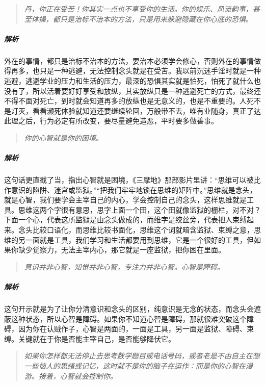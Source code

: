 \begin{quote}\it
    丹，你正在受苦！你其实一点也不享受你的生活。你的娱乐、风流韵事，甚至体操，都只是治标不治本的方法，只是用来躲避隐藏在你心底的恐惧。
\end{quote}

\subparagraph{解析} 外在的事情，都只是治标不治本的方法，要治本必须学会修心，否则外在的事情做得再多，也只是一种逃避，无法控制念头就是在受苦。我以前沉迷手淫时就是一种逃避，逃避学业的压力和生活的压力，最深的恐惧其实就是怕死，怕死了就什么也没有了，所以活着要好好享受和放纵，其实放纵只是一种逃避死亡的方式，最终还不得不面对死亡，到时就会知道再多的放纵也是无意义的，也是不重要的。人死不是灯灭，看看濒死体验就知道还要继续轮回，万般带不去，唯有业随身，真正了达此理之后，行为必定有所改变，要尽量避免造恶，平时要多做善事。

\begin{quote}\it
    你的心智就是你的困境。
\end{quote}

\subparagraph{解析} 这句话更直截了当，指出心智就是困境，《三摩地》那部影片里讲：“思维可以被比作意识的陷阱、迷宫或监狱。”“把我们牢牢地锁在思维的矩阵中。”思维就是念头，就是心智，我们要学会主宰自己的内心，学会控制自己的念头，这样思维就是工具。思维这两个字很有意思，思字上面一个田，这个田就像监狱的栅栏，对不对？下面一个心，代表这所监狱是由念头做成的，而维字是绞丝旁，代表把人束缚起来。念头比较口语化，而思维比较书面化，思维这个词就暗含监狱、束缚之意，思维的另一面就是工具，我们学习和生活都要用到思维，它是一个很好的工具，但如果你缺少觉察力，无法主宰内心，那它就是一座监狱，把你困在里面。

\begin{quote}\it
    意识并非心智，知觉并非心智，专注力并非心智。心智是障碍。
\end{quote}

\subparagraph{解析} 这句开示就是为了让你分清意识和念头的区别，纯意识是无念的状态，而念头会遮蔽这种状态，所以心智是障碍。如果你不知道心智是障碍，那就很难突破这个障碍，因为你在认贼作子，心智是两面的，一面是工具，另一面是监狱、障碍、束缚。关键就在于你是否能主宰自己，是否能够降伏它。

\begin{quote}\it
    如果你怎样都无法停止去思考数学题目或电话号码，或者老是不由自主在想一些恼人的思绪或记忆，这时就不是你的脑子在运作：而是你的心智在漫游。接着，心智就会控制你。
\end{quote}

